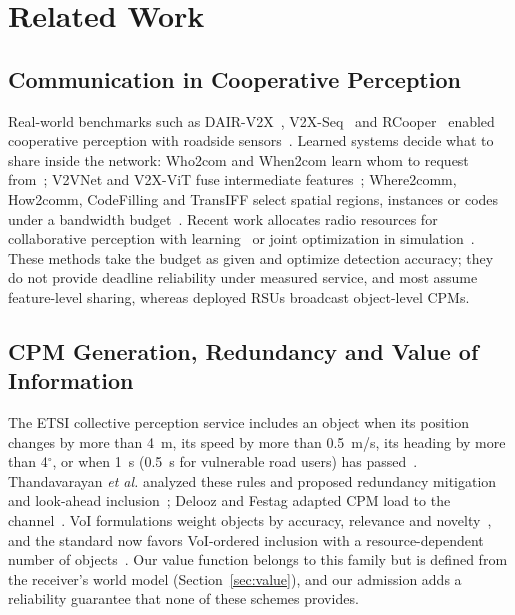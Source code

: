 \documentclass[journal]{IEEEtran}
\theoremstyle{remark}
\begin{document}
\section{Related Work}\label{sec:related}
\subsection{Communication in Cooperative Perception}
Real-world benchmarks such as DAIR-V2X~\cite{dairv2x}, V2X-Seq~\cite{v2xseq} and RCooper~\cite{rcooper} enabled cooperative perception with roadside sensors~\cite{v2xsurvey2025}. Learned systems decide what to share inside the network: Who2com and When2com learn whom to request from~\cite{who2com,when2com}; V2VNet and V2X-ViT fuse intermediate features~\cite{v2vnet,v2xvit}; Where2comm, How2comm, CodeFilling and TransIFF select spatial regions, instances or codes under a bandwidth budget~\cite{where2comm,how2comm,codefilling,transiff}. Recent work allocates radio resources for collaborative perception with learning~\cite{racooper,hmsscp} or joint optimization in simulation~\cite{itora,fullperception}. These methods take the budget as given and optimize detection accuracy; they do not provide deadline reliability under measured service, and most assume feature-level sharing, whereas deployed RSUs broadcast object-level CPMs.

\subsection{CPM Generation, Redundancy and Value of Information}
The ETSI collective perception service includes an object when its position changes by more than 4~m, its speed by more than 0.5~m/s, its heading by more than 4$^\circ$, or when 1~s (0.5~s for vulnerable road users) has passed~\cite{etsi103562,etsi103324}. Thandavarayan \emph{et al.} analyzed these rules and proposed redundancy mitigation and look-ahead inclusion~\cite{thandavarayan2020generation,thandavarayan2020redundancy}; Delooz and Festag adapted CPM load to the channel~\cite{delooz2019}. VoI formulations weight objects by accuracy, relevance and novelty~\cite{higuchi2019value,giordani2019voi,lyu2025voi}, and the standard now favors VoI-ordered inclusion with a resource-dependent number of objects~\cite{lyu2025survey}. Our value function belongs to this family but is defined from the receiver's world model (Section~\ref{sec:value}), and our admission adds a reliability guarantee that none of these schemes provides.
\end{document}
